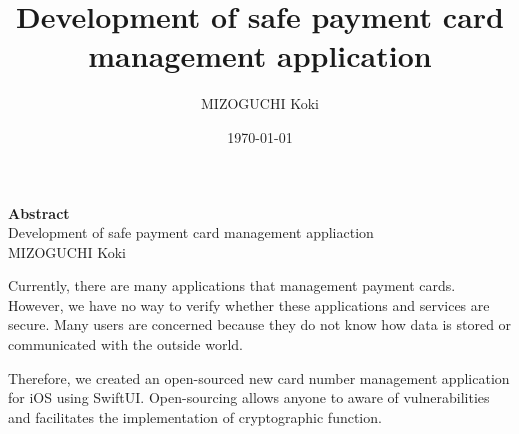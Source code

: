 \documentclass[paper=a4,12pt]{report}
\title{\Huge \textbf{Development of safe payment card management application}}
\author{\LARGE MIZOGUCHI Koki}
\date{\today}
\begin{document}
\maketitle
\begin{center}
    {\LARGE\textbf{Abstract}}\\\vspace{1em}
    {\Large Development of safe payment card management appliaction}\\\vspace{1em}
    {MIZOGUCHI Koki}
\end{center}

Currently, there are many applications that management payment cards.
However, we have no way to verify whether these applications and services are secure.
Many users are concerned because they do not know how data is stored or communicated with the outside world.

Therefore, we created an open-sourced new card number management application for iOS using SwiftUI.
Open-sourcing allows anyone to aware of vulnerabilities and facilitates the implementation of cryptographic function.
\tableofcontents
\chapter{}
\end{document}
